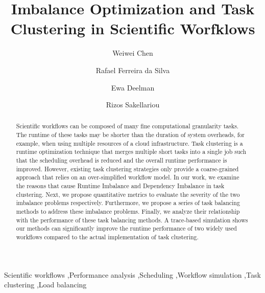 \documentclass[final,5p,times,twocolumn]{elsarticle}
\begin{document}
\begin{frontmatter}

\title{Imbalance Optimization and Task Clustering in Scientific Worfklows}


\author[isi]{Weiwei Chen}

\author[isi]{Rafael Ferreira da Silva}

\author[isi]{Ewa Deelman}


\author[man]{Rizos Sakellariou}



\address[isi]{University of Southern California, Information Sciences Institute, Marina del Rey, CA, USA}
\address[man]{University of Manchester, School of Computer Science, Manchester, U.K.}


\begin{abstract}
Scientific workflows can be composed of many fine computational granularity tasks. The runtime of these tasks may be shorter than the duration of system overheads, for example, when using multiple resources of a cloud infrastructure. Task clustering is a runtime optimization technique that merges multiple short tasks into a single job such that the scheduling overhead is reduced and the overall runtime performance is improved. However, existing task clustering strategies only provide a coarse-grained approach that relies on an over-simplified workflow model. In our work, we examine the reasons that cause Runtime Imbalance and Dependency Imbalance in task clustering. Next, we propose quantitative metrics to evaluate the severity of the two imbalance problems respectively. Furthermore, we propose a series of task balancing methods to address these imbalance problems. Finally, we analyze their relationship with the performance of these task balancing methods. A trace-based simulation shows our methods can significantly improve the runtime performance of two widely used workflows compared to the actual implementation of task clustering.

\end{abstract}

\begin{keyword}
Scientific workflows \sep Performance analysis \sep Scheduling \sep Workflow simulation \sep Task clustering \sep Load balancing
\end{keyword}

\end{frontmatter}
\end{document}
